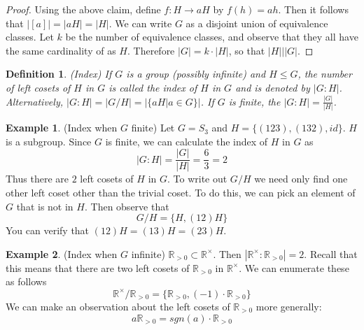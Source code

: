 \documentclass[12pt]{article}
\newtheorem{definition}{Definition}
\theoremstyle{definition}
\newtheorem{example}{Example}
\theoremstyle{definition}
\begin{document}
\begin{proof}
Using the above claim, define $f : H \to aH$ by $f(h) = ah$. Then it follows that $|[a] | = |aH| = |H|$. We can write $G$ as a disjoint union of equivalence classes. Let $k$ be the number of equivalence classes, and observe that they all have the same cardinality of as $H$. Therefore $|G| = k \cdot |H|$, so that $|H| \big\vert |G|$.
\end{proof}

\begin{definition}(Index)
If $G$ is a group (possibly infinite) and $H \leq G$, the number of left cosets of $H$ in $G$ is called the index of $H$ in $G$ and is denoted by $|G : H|$. Alternatively, $|G : H| = | G / H | =  |\{aH | a \in G\} |$. If $G$ is finite, the $|G:H| = \frac{|G|}{|H|}$.
\end{definition}

\begin{example}(Index when $G$ finite)
Let $G = S_3$ and $H = \{ (1 2 3), (1 3 2), id \}$. $H$ is a subgroup. Since $G$ is finite, we can calculate the index of $H$ in $G$ as
\begin{equation}
	|G : H| = \frac{|G|}{|H|} = \frac{6}{3} = 2
\end{equation}
Thus there are $2$ left cosets of $H$ in $G$. To write out $G/H$ we need only find one other left coset other than the trivial coset. To do this, we can pick an element of $G$ that is not in $H$. Then observe that 
\begin{equation}
	G/H = \{H, (1 2) H \}
\end{equation}
You can verify that $(1 2) H = (1 3) H = (2 3) H$.
\end{example}

\begin{example}(Index when $G$ infinite)
$\mathbb{R}_{>0} \subset \mathbb{R}^{\times}$. Then $|\mathbb{R}^{\times} : \mathbb{R}_{> 0}| = 2$. Recall that this means that there are two left cosets of $\mathbb{R}_{>0}$ in $\mathbb{R}^{\times}$. We can enumerate these as follows
\begin{equation}
	\mathbb{R}^{\times} / \mathbb{R}_{> 0} = \{\mathbb{R}_{> 0}, (-1) \cdot \mathbb{R}_{> 0}\}
\end{equation}
We can make an observation about the left cosets of $\mathbb{R}_{> 0}$ more generally:
\begin{equation}
	a \mathbb{R}_{> 0} = sgn(a) \cdot \mathbb{R}_{> 0}
\end{equation}
\end{example}
\end{document}
